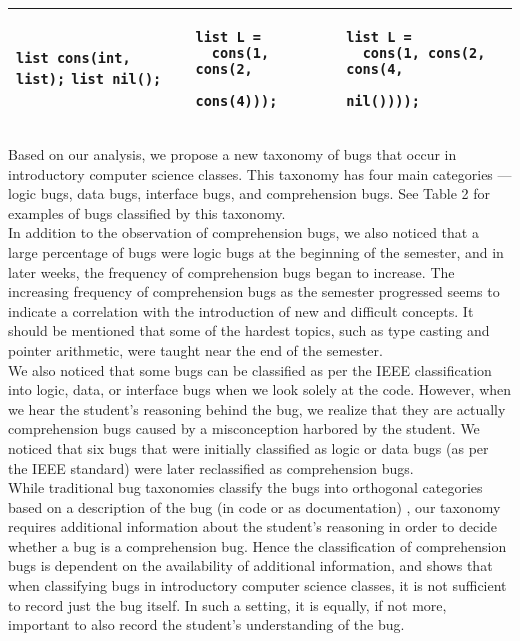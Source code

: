 \documentclass{sig-alternate}
\begin{document}
\begin{table*}
\begin{tabular}{|p{0.95in}|p{1.6in}|p{2in}|p{2.1in}|}
\verb|list cons(int, list);|
\verb|list nil();|
&
\begin{verbatim}
list L =
  cons(1, cons(2,
              cons(4)));
\end{verbatim}
&
\begin{verbatim}
list L =
  cons(1, cons(2, cons(4,
                  nil())));
\end{verbatim}
\\ \hline
\end{tabular}
\end{table*}

Based on our analysis, we propose a new taxonomy of bugs that occur in introductory computer science classes. This taxonomy has four main categories --- logic bugs, data bugs, interface bugs, and comprehension bugs. See Table 2 for examples of bugs classified by this taxonomy.\\

In addition to the observation of comprehension bugs, we also noticed that a large percentage of bugs were logic bugs at the beginning of the semester, and in later weeks, the frequency of comprehension bugs began to increase. The increasing frequency of comprehension bugs as the semester progressed seems to indicate a correlation with the introduction of new and difficult concepts. It should be mentioned that some of the hardest topics, such as type casting and pointer arithmetic, were taught near the end of the semester.\\

We also noticed that some bugs can be classified as per the IEEE classification into logic, data, or interface bugs when we look solely at the code. However, when we hear the student's reasoning behind the bug, we realize that they are actually comprehension bugs caused by a misconception harbored by the student. We noticed that six bugs that were initially classified as logic or data bugs (as per the IEEE standard) were later reclassified as comprehension bugs.\\

While traditional bug taxonomies classify the bugs into orthogonal categories based on a description of the bug (in code or as documentation) \cite{Beizer90}, our taxonomy requires additional information about the student's reasoning in order to decide whether a bug is a comprehension bug. Hence the classification of comprehension bugs is dependent  on the availability of additional information, and shows that when classifying bugs in introductory computer science classes, it is not sufficient to record just the bug itself. In such a setting, it is equally, if not more, important to also record the student's understanding of the bug.\\
\end{document}
